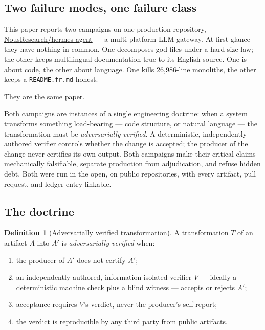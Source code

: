 \documentclass[11pt]{article}
\theoremstyle{definition}
\newtheorem{definition}{Definition}
\theoremstyle{plain}
\theoremstyle{remark}
\begin{document}
\subsection{Two failure modes, one failure class}

This paper reports two campaigns on one production repository,
\href{https://github.com/NousResearch/hermes-agent}{NousResearch/hermes-agent}
--- a multi-platform LLM gateway. At first glance they have nothing in common.
One decomposes god files under a hard size law; the other keeps multilingual
documentation true to its English source. One is about code, the other about
language. One kills 26{,}986-line monoliths, the other keeps a
\texttt{README.fr.md} honest.

They are the same paper.

Both campaigns are instances of a single engineering doctrine: when a system
transforms something load-bearing --- code structure, or natural language ---
the transformation must be \emph{adversarially verified}. A deterministic,
independently authored verifier controls whether the change is accepted; the
producer of the change never certifies its own output. Both campaigns make
their critical claims mechanically falsifiable, separate production from
adjudication, and refuse hidden debt. Both were run in the open, on public
repositories, with every artifact, pull request, and ledger entry linkable.

\subsection{The doctrine}

\begin{definition}[Adversarially verified transformation]
\label{def:avt}
A transformation $T$ of an artifact $A$ into $A'$ is \emph{adversarially
verified} when:
\begin{enumerate}[leftmargin=*]
\item the producer of $A'$ does not certify $A'$;
\item an independently authored, information-isolated verifier $V$ ---
  ideally a deterministic machine check plus a blind witness --- accepts or
  rejects $A'$;
\item acceptance requires $V$'s verdict, never the producer's self-report;
\item the verdict is reproducible by any third party from public artifacts.
\end{enumerate}
\end{definition}
\end{document}
